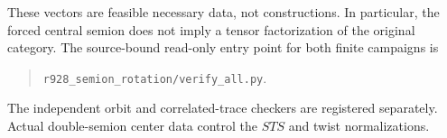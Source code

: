 These vectors are feasible necessary data, not constructions. In
particular, the forced central semion does not imply a tensor
factorization of the original category. The source-bound read-only
entry point for both finite campaigns is
\begin{quote}\small
\texttt{r928\_semion\_rotation/verify\_all.py}.
\end{quote}
The independent orbit and correlated-trace checkers are registered
separately. Actual double-semion center data control the $STS$ and twist
normalizations.
